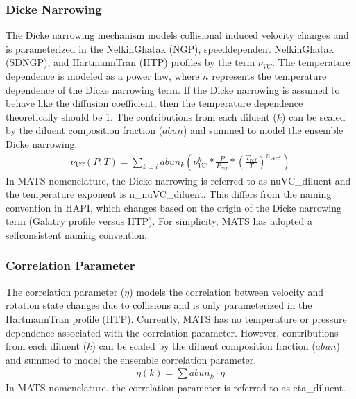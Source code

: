 \documentclass[letterpaper,10pt,english]{sphinxmanual}
\begin{document}
\subsubsection{Dicke Narrowing}
\label{\detokenize{MATS Summary:dicke-narrowing}}
\sphinxAtStartPar
The Dicke narrowing mechanism models collisional induced velocity changes and is parameterized in the Nelkin\sphinxhyphen{}Ghatak (NGP), speed\sphinxhyphen{}dependent Nelkin\sphinxhyphen{}Ghatak (SDNGP), and Hartmann\sphinxhyphen{}Tran (HTP) profiles by the term \(\nu_{VC}\). The temperature dependence is modeled as a power law, where \(n\) represents the temperature dependence of the Dicke narrowing term.  If the Dicke narrowing is assumed to behave like the diffusion coefficient, then the temperature dependence theoretically should be 1.  The contributions from each diluent (\(k\)) can be scaled by the diluent composition fraction (\(abun\)) and summed to model the ensemble Dicke narrowing.
\begin{equation*}
\begin{split}\nu_{VC} (P,T) = \sum_{k=i} abun_{k} (\nu_{VC}^{k} * \frac{P}{P_{ref}} * (\frac{T_{ref}}{T})^{n_{\nu{VC}^{k}}})\end{split}
\end{equation*}
\sphinxAtStartPar
In MATS nomenclature, the Dicke narrowing is referred to as nuVC\_diluent and the temperature exponent is n\_nuVC\_diluent.  This differs from the naming convention in HAPI, which changes based on the origin of the Dicke narrowing term (Galatry profile versus HTP).  For simplicity, MATS has adopted a self\sphinxhyphen{}consistent naming convention.


\subsubsection{Correlation Parameter}
\label{\detokenize{MATS Summary:correlation-parameter}}
\sphinxAtStartPar
The correlation parameter (\(\eta\)) models the correlation between velocity and rotation state changes due to collisions and is only parameterized in the Hartmann\sphinxhyphen{}Tran profile (HTP).  Currently, MATS has no temperature or pressure dependence associated with the correlation parameter.  However, contributions from each diluent (\(k\)) can be scaled by the diluent composition fraction (\(abun\)) and summed to model the ensemble correlation parameter.
\begin{equation*}
\begin{split}\eta (k) = \sum abun_{k} \cdot \eta\end{split}
\end{equation*}
\sphinxAtStartPar
In MATS nomenclature, the correlation parameter is referred to as eta\_diluent.
\end{document}
